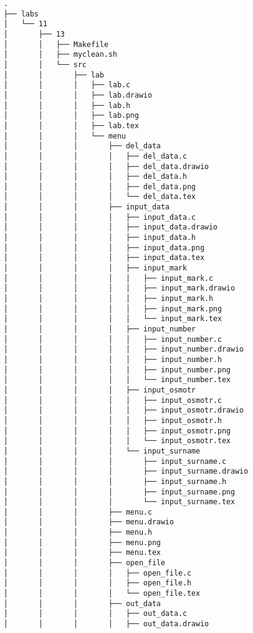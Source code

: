 \begin{verbatim}
.
├── labs
│   └── 11
│       ├── 13
│       │   ├── Makefile
│       │   ├── myclean.sh
│       │   └── src
│       │       ├── lab
│       │       │   ├── lab.c
│       │       │   ├── lab.drawio
│       │       │   ├── lab.h
│       │       │   ├── lab.png
│       │       │   ├── lab.tex
│       │       │   └── menu
│       │       │       ├── del_data
│       │       │       │   ├── del_data.c
│       │       │       │   ├── del_data.drawio
│       │       │       │   ├── del_data.h
│       │       │       │   ├── del_data.png
│       │       │       │   └── del_data.tex
│       │       │       ├── input_data
│       │       │       │   ├── input_data.c
│       │       │       │   ├── input_data.drawio
│       │       │       │   ├── input_data.h
│       │       │       │   ├── input_data.png
│       │       │       │   ├── input_data.tex
│       │       │       │   ├── input_mark
│       │       │       │   │   ├── input_mark.c
│       │       │       │   │   ├── input_mark.drawio
│       │       │       │   │   ├── input_mark.h
│       │       │       │   │   ├── input_mark.png
│       │       │       │   │   └── input_mark.tex
│       │       │       │   ├── input_number
│       │       │       │   │   ├── input_number.c
│       │       │       │   │   ├── input_number.drawio
│       │       │       │   │   ├── input_number.h
│       │       │       │   │   ├── input_number.png
│       │       │       │   │   └── input_number.tex
│       │       │       │   ├── input_osmotr
│       │       │       │   │   ├── input_osmotr.c
│       │       │       │   │   ├── input_osmotr.drawio
│       │       │       │   │   ├── input_osmotr.h
│       │       │       │   │   ├── input_osmotr.png
│       │       │       │   │   └── input_osmotr.tex
│       │       │       │   └── input_surname
│       │       │       │       ├── input_surname.c
│       │       │       │       ├── input_surname.drawio
│       │       │       │       ├── input_surname.h
│       │       │       │       ├── input_surname.png
│       │       │       │       └── input_surname.tex
│       │       │       ├── menu.c
│       │       │       ├── menu.drawio
│       │       │       ├── menu.h
│       │       │       ├── menu.png
│       │       │       ├── menu.tex
│       │       │       ├── open_file
│       │       │       │   ├── open_file.c
│       │       │       │   ├── open_file.h
│       │       │       │   └── open_file.tex
│       │       │       ├── out_data
│       │       │       │   ├── out_data.c
│       │       │       │   ├── out_data.drawio

\end{verbatim}
